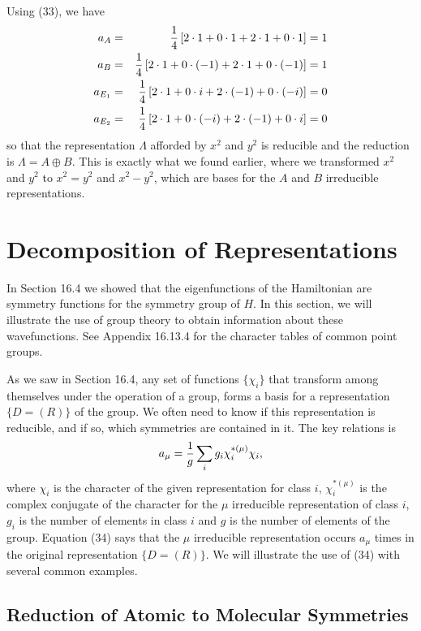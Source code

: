 Using (33), we have
\begin{eqnarray}
a_A &=& {1 \over 4} \left[ 2 \cdot 1 + 0 \cdot 1 + 2 \cdot 1 + 0 \cdot 
1 \right] = 1\cr
a_B &=& {1 \over 4} \left[ 2 \cdot 1 + 0 \cdot (-1) + 2 \cdot 1 + 0 
\cdot (-1) \right] = 1\cr
a_{E_1} &=& {1 \over 4} \left[ 2 \cdot 1 + 0 \cdot i + 2 \cdot (-1) + 
0 \cdot (-i) \right] = 0\cr
a_{E_2} &=& {1 \over 4} \left[ 2 \cdot 1 + 0 \cdot (-i) + 2 \cdot 
(-1) + 0 \cdot i \right] = 0
\end{eqnarray}
so that the representation $\Lambda$ afforded by $x^2$ and $y^2$ is 
reducible and the reduction is $\Lambda = A \oplus B$.  This is 
exactly what we found earlier, where we transformed $x^2$ and $y^2$ 
to $x^2 = y^2$ and $x^2 - y^2$, which are bases for the $A$ and $B$ 
irreducible representations.

\section{Decomposition of Representations}

In Section 16.4 we showed that the eigenfunctions of the Hamiltonian 
are symmetry functions for the symmetry group of $H$.  In this section, 
we will illustrate the use of group theory to obtain information about 
these wavefunctions. See Appendix 16.13.4 for the character tables of common 
point groups.

As we saw in Section 16.4, any set of functions $\{ \chi_i \}$ that 
transform among themselves under the operation of a group, forms a 
basis for a representation $\{ D= (R)\}$ of the group.  We often need 
to know if this representation is reducible, and if so, which 
symmetries are contained in it.  The key relations is
\begin{equation}
a_{\mu} = {1 \over g} \sum_{i} g_i \chi_i^{* (\mu)} \chi_i , 
\label{chap16-eqno34}
\end{equation}
where $\chi_i$ is the character of the given representation for class 
$i$, $\chi_i^{*(\mu)}$ is the complex conjugate of the character for 
the $\mu$ irreducible representation of class $i$, $g_i$ is the 
number of elements in class $i$ and $g$ is the number of elements of 
the group. Equation (34) says that the $\mu$ irreducible representation 
occurs $a_{\mu}$ times in the original representation $\{ D = (R)\}$.  
We will illustrate the use of (34) with several common examples.

\subsection{Reduction of Atomic to Molecular Symmetries}

